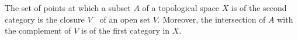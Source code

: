 The set of points at which a subset $A$ of a topological space $X$ is of the second category is the closure $V^{-}$ of an open set $V$. Moreover, the intersection of $A$ with the complement of $V$ is of the first category in $X$.

